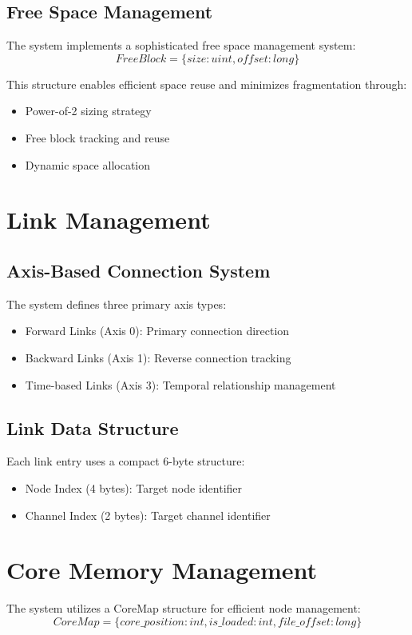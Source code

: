 \subsection{Free Space Management}
The system implements a sophisticated free space management system:
\begin{equation}
    FreeBlock = \{size: uint, offset: long\}
\end{equation}

This structure enables efficient space reuse and minimizes fragmentation through:
\begin{itemize}
    \item Power-of-2 sizing strategy
    \item Free block tracking and reuse
    \item Dynamic space allocation
\end{itemize}

\section{Link Management}\label{Sec:Links}
\subsection{Axis-Based Connection System}
The system defines three primary axis types:
\begin{itemize}
    \item Forward Links (Axis 0): Primary connection direction
    \item Backward Links (Axis 1): Reverse connection tracking
    \item Time-based Links (Axis 3): Temporal relationship management
\end{itemize}

\subsection{Link Data Structure}
Each link entry uses a compact 6-byte structure:
\begin{itemize}
    \item Node Index (4 bytes): Target node identifier
    \item Channel Index (2 bytes): Target channel identifier
\end{itemize}

\section{Core Memory Management}\label{Sec:CoreMemory}
The system utilizes a CoreMap structure for efficient node management:
\begin{equation}
    CoreMap = \{core\_position: int, is\_loaded: int, file\_offset: long\}
\end{equation}

